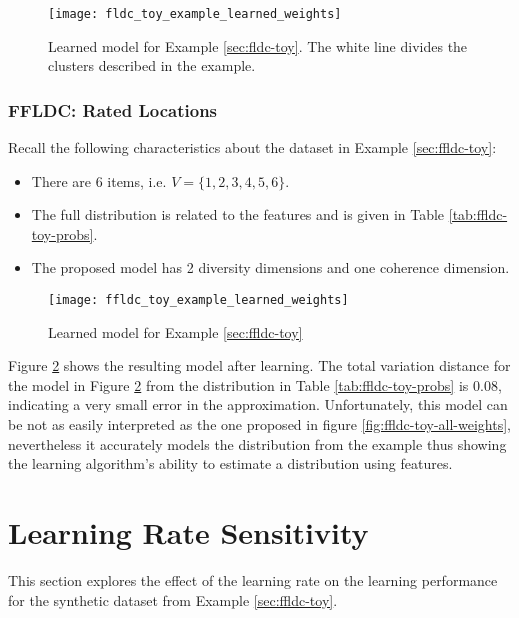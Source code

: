 \begin{figure}
  \centering
  \texttt{[image: fldc\_toy\_example\_learned\_weights]}
  \caption{Learned model for Example \ref{sec:fldc-toy}. The white line divides the clusters described in the example.}
  \label{fig:fldc-toy-learned-weights}
\end{figure}

\subsubsection{FFLDC: Rated Locations}

Recall the following characteristics about the dataset in Example \ref{sec:ffldc-toy}:

\begin{itemize}
  \item There are 6 items, i.e. $V = \{1,2,3,4,5,6\}$.
  \item The full distribution is related to the features and is given in Table \ref{tab:ffldc-toy-probs}.
  \item The proposed model has 2 diversity dimensions and one coherence dimension.
\end{itemize}

\begin{figure}
  \centering
  \texttt{[image: ffldc\_toy\_example\_learned\_weights]}
  \caption{Learned model for Example \ref{sec:ffldc-toy}}
  \label{fig:ffldc-toy-learned-weights}
\end{figure}

Figure \ref{fig:ffldc-toy-learned-weights} shows the resulting model after learning. The total variation distance for the model in Figure \ref{fig:ffldc-toy-learned-weights} from the distribution in Table \ref{tab:ffldc-toy-probs} is $0.08$, indicating a very small error in the approximation. Unfortunately, this model can be not as easily interpreted as the one proposed in figure \ref{fig:ffldc-toy-all-weights}, nevertheless it accurately models the distribution from the example thus showing the learning algorithm's ability to estimate a distribution using features. 

\section{Learning Rate Sensitivity}

This section explores the effect of the learning rate on the learning performance for the synthetic dataset from Example \ref{sec:ffldc-toy}.

